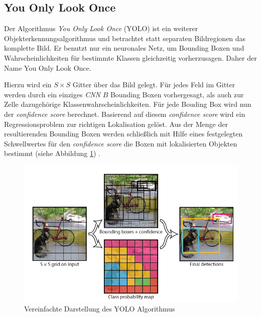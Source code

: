 \subsection*{You Only Look Once}

Der Algorithmus \textit{You Only Look Once} (YOLO) ist ein weiterer Objekterkennungsalgorithmus und betrachtet statt separaten Bildregionen das komplette Bild. Er benutzt nur ein neuronales Netz, um Bounding Boxen und Wahrscheinlichkeiten für bestimmte Klassen gleichzeitig vorherzusagen. Daher der Name \glqq You Only Look Once\grqq{}.

Hierzu wird ein $S \times S$ Gitter über das Bild gelegt. Für jedes Feld im Gitter werden durch ein einziges \textit{CNN} $B$ Bounding Boxen vorhergesagt, als auch zur Zelle dazugehörige Klassenwahrscheinlichkeiten. Für jede Bouding Box wird nun der \textit{confidence score} berechnet. Basierend auf diesem \textit{confidence score} wird ein Regressionsproblem zur richtigen Lokalisation gelöst. Aus der Menge der resultierenden Bounding Boxen werden schließlich mit Hilfe eines festgelegten Schwellwertes für den \textit{confidence score} die Boxen mit lokalisierten Objekten bestimmt (siehe Abbildung \ref{yolo_model}) \cite{JosephRedmon.2016}.

\begin{figure}[ht]
	\begin{center}
		\includegraphics[width=15cm]{Bilder/yolo_model.png} 
		\caption[Vereinfachte Darstellung des YOLO Algorithmus]{Vereinfachte Darstellung des YOLO Algorithmus \cite{JosephRedmon.2016}}
		\label{yolo_model}
	\end{center}
\end{figure}

\newpage

